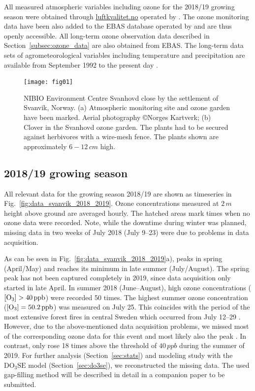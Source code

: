 \documentclass[bg, manuscript]{copernicus}
\begin{document}
All measured atmospheric variables including ozone for the 2018/19 growing season were obtained through \href{luftkvalitet.no}{luftkvalitet.no} operated by \citet{NILU_AIRQ}. The ozone monitoring data have been also added to the EBAS database operated by \citet{NILU_EBAS} and are thus openly accessible. All long-term ozone observation data described in Section~\ref{subsec:ozone_data} are also obtained from EBAS. The long-term data sets of agrometeorological variables including temperature and precipitation are available from September 1992 to the present day \citep[LandbruksMeteorologiske Tjeneste][note the station name here is Pasvik]{LMT_NIBIO}.

\begin{figure}[t]
  \texttt{[image: fig01]}
  \caption{NIBIO Environment Centre Svanhovd close by the settlement of Svanvik, Norway. (a) Atmospheric monitoring site and ozone garden have been marked. Aerial photography \copyright Norges Kartverk; (b) Clover in the Svanhovd ozone garden. The plants had to be secured against herbivores with a wire-mesh fence. The plants shown are approximately $6-12\,\unit{cm}$ high.}
  \label{fig:svanhovd_research_station}
\end{figure}


\subsection{2018/19 growing season}
\label{subsec:growing_season_1819}

All relevant data for the growing season 2018/19 are shown as timeseries in Fig.~\ref{fig:data_svanvik_2018_2019}. Ozone concentrations measured at $2\,\unit{m}$ height above ground are averaged hourly. The hatched areas mark times when no ozone data were recorded. Note, while the downtime during winter was planned, missing data in two weeks of July 2018 (July 9--23) were due to problems in data acquisition.

As can be seen in Fig.~\ref{fig:data_svanvik_2018_2019}a), \chem{[O_3]} peaks in spring (April/May) and reaches its minimum in late summer (July/August). The spring peak has not been captured completely in 2019, since data acquisition only started in late April. In summer 2018 (June--August), high ozone concentrations ($\chem{[O_3]} > 40\,\unit{ppb}$) were recorded 50 times. The highest summer ozone concentration ($\chem{[O_3]} = 50.2\,\unit{ppb}$) was measured on July 25. This coincides with the period of the most extensive forest fires in central Sweden which occurred from July 12--29 \citep{SOU2019}. However, due to the above-mentioned data acquisition problems, we missed most of the corresponding ozone data for this event and most likely also the peak \chem{[O_3]}. In contrast, \chem{[O_3]} only rose 18 times above the threshold of $40\,\unit{ppb}$ during the summer of 2019. For further analysis (Section~\ref{sec:stats}) and modeling study with the $\mathrm{DO_3SE}$ model (Section~\ref{sec:do3se}), we reconstructed the missing data. The used gap-filling method will be described in detail in a companion paper to be submitted.
\end{document}
